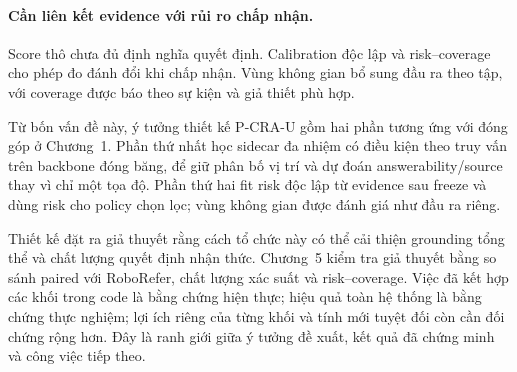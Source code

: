 \paragraph{Cần liên kết evidence với rủi ro chấp nhận.}
Score thô chưa đủ định nghĩa quyết định. Calibration độc lập và risk--coverage cho phép đo đánh đổi khi chấp nhận. Vùng không gian bổ sung đầu ra theo tập, với coverage được báo theo sự kiện và giả thiết phù hợp.

Từ bốn vấn đề này, ý tưởng thiết kế P-CRA-U gồm hai phần tương ứng với đóng góp ở Chương~1. Phần thứ nhất học sidecar đa nhiệm có điều kiện theo truy vấn trên backbone đóng băng, để giữ phân bố vị trí và dự đoán answerability/source thay vì chỉ một tọa độ. Phần thứ hai fit risk độc lập từ evidence sau freeze và dùng risk cho policy chọn lọc; vùng không gian được đánh giá như đầu ra riêng.

Thiết kế đặt ra giả thuyết rằng cách tổ chức này có thể cải thiện grounding tổng thể và chất lượng quyết định nhận thức. Chương~5 kiểm tra giả thuyết bằng so sánh paired với RoboRefer, chất lượng xác suất và risk--coverage. Việc đã kết hợp các khối trong code là bằng chứng hiện thực; hiệu quả toàn hệ thống là bằng chứng thực nghiệm; lợi ích riêng của từng khối và tính mới tuyệt đối còn cần đối chứng rộng hơn. Đây là ranh giới giữa ý tưởng đề xuất, kết quả đã chứng minh và công việc tiếp theo.

